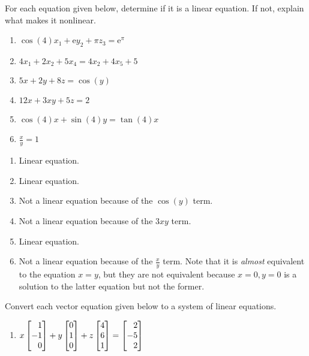 \begin{exercises}
	\begin{problist}
		\prob For each equation given below, determine if it is a linear
		equation. If not, explain what makes it nonlinear.
		\begin{enumerate}
			\item $\cos(4)x_{1}+\mathrm{e}y_{2}+\pi z_{3}=\mathrm{e}^{\pi}$

			\item $4x_{1}+2x_{2}+5x_{4}=4x_{2}+4x_{5}+5$

			\item $5x+2y+8z=\cos(y)$

			\item $12x+3xy+5z=2$

			\item $\cos(4)x+\sin(4)y=\tan(4)x$

			\item $\frac{x}{y}=1$
		\end{enumerate}
		\begin{solution}
			\begin{enumerate}
				\item Linear equation.

				\item Linear equation.

				\item Not a linear equation because of the $\cos(y)$ term.

				\item Not a linear equation because of the $3xy$ term.

				\item Linear equation.

				\item Not a linear equation because of the $\frac{x}{y}$ term.
					Note that it is \emph{almost} equivalent to the equation $x=y$,
					but they are not equivalent because $x = 0,y = 0$ is a
					solution to the latter equation but not the former.
			\end{enumerate}
		\end{solution}

		\prob Convert each vector equation given below to a system of linear
		equations.

		\begin{enumerate}
			\item $x\mat{1 \\ -1 \\ 0}+y\mat{0 \\ 1 \\ 0}+z\mat{4 \\ 6 \\ 1}=\mat
				{2 \\ -5 \\ 2}$


\end{enumerate}
\end{problist}
\end{exercises}
